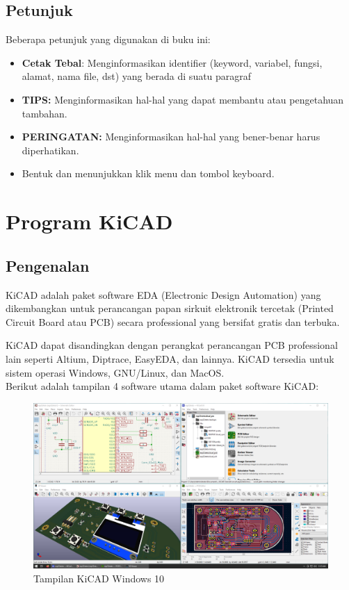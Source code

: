 \documentclass[12pt]{book}
\begin{document}
	\section{Petunjuk}
	Beberapa petunjuk yang digunakan di buku ini:
	\begin{itemize}
		\item \textbf{Cetak Tebal}: Menginformasikan identifier (keyword, variabel, fungsi, alamat, nama file, dst) yang berada di suatu paragraf
		\item \textbf{TIPS:} Menginformasikan hal-hal yang dapat membantu atau pengetahuan tambahan.
		\item \textbf{PERINGATAN:} Menginformasikan hal-hal yang bener-benar harus diperhatikan.
		\item Bentuk  dan  menunjukkan klik menu dan tombol keyboard.
	\end{itemize}


	\newpage
	\mainmatter
	\chapter{Program KiCAD}

	\section{Pengenalan}

	KiCAD adalah paket software EDA (Electronic Design Automation) yang dikembangkan untuk perancangan papan sirkuit elektronik tercetak (Printed Circuit Board atau PCB)
	secara professional yang bersifat gratis dan terbuka.

	KiCAD dapat disandingkan dengan perangkat perancangan PCB professional lain seperti Altium, Diptrace, EasyEDA, dan lainnya.
	KiCAD tersedia untuk sistem operasi Windows, GNU/Linux, dan MacOS.\\

	Berikut adalah tampilan 4 software utama dalam paket software KiCAD:
	\begin{figure}[!ht]
		\centering
		\includegraphics[width=\textwidth]{images/kicad_windows10}
		\caption{Tampilan KiCAD Windows 10}
	\end{figure}
\end{document}
